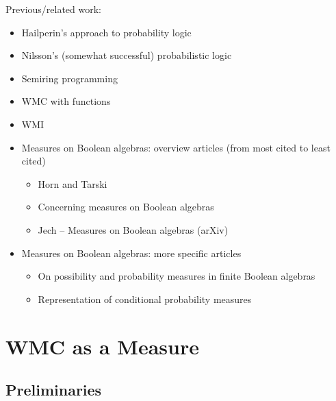 \documentclass{article}
\theoremstyle{definition}
\theoremstyle{remark}
\begin{document}
Previous/related work:
\begin{itemize}
\item Hailperin's approach to probability logic
  \cite{DBLP:journals/ndjfl/Hailperin84}
\item Nilsson's (somewhat successful) probabilistic logic
  \cite{DBLP:journals/ai/Nilsson86}
\item Semiring programming \cite{DBLP:journals/corr/BelleR16}
\item WMC with functions \cite{DBLP:conf/uai/Belle17}
\item WMI \cite{DBLP:conf/ijcai/BellePB15}
\item Measures on Boolean algebras: overview articles (from most cited to least
  cited)
  \begin{itemize}
  \item Horn and Tarski \cite{horn1948measures}
  \item Concerning measures on Boolean algebras \cite{gaifman1964concerning}
  \item Jech -- Measures on Boolean algebras (arXiv) \cite{jech2017measures}
  \end{itemize}
\item Measures on Boolean algebras: more specific articles
  \begin{itemize}
  \item On possibility and probability measures in finite Boolean algebras
    \cite{DBLP:journals/soco/CastineiraCT02}
  \item Representation of conditional probability measures
    \cite{krauss1968representation}
  \end{itemize}
\end{itemize}

\section{WMC as a Measure}

\subsection{Preliminaries}
\end{document}
